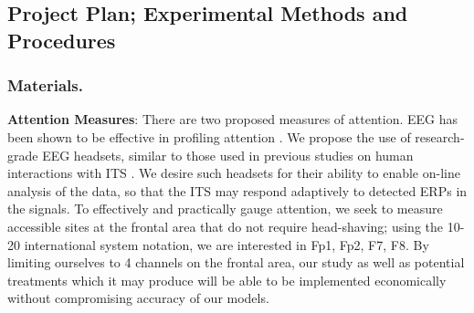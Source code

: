\documentclass[hidelinks,11pt]{article}
\begin{document}
 
 
 


\subsection{ Project Plan; Experimental Methods and Procedures  }

\subsubsection{ Materials.  }

\textbf{Attention Measures}:  There are two proposed measures of attention.
EEG has been shown to be effective in profiling attention {\citep{alzoubi2008,
li2011, rodrigue2015, chaouachi2012}}.  We propose the use of research-grade
EEG headsets, similar to those used in previous studies on human interactions
with ITS {\citep{szafir2013, li2011, haapalainen2013, galan2012}}.  We desire
such headsets for their ability to enable on-line analysis of the data, so that
the ITS may respond adaptively to detected ERPs in the signals. To effectively
and practically gauge attention, we seek to measure accessible sites at the
frontal area that do not require head-shaving; using the 10-20 international
system notation, we are interested in Fp1, Fp2, F7, F8.  By limiting ourselves
to 4 channels on the frontal area, our study as well as potential treatments
which it may produce will be able to be implemented economically without
compromising accuracy of our models. 
\end{document}
